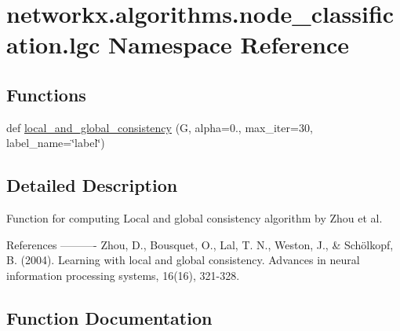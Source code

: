 \hypertarget{namespacenetworkx_1_1algorithms_1_1node__classification_1_1lgc}{}\section{networkx.\+algorithms.\+node\+\_\+classification.\+lgc Namespace Reference}
\label{namespacenetworkx_1_1algorithms_1_1node__classification_1_1lgc}
\subsection*{Functions}
\begin{DoxyCompactItemize}
\item 
def \hyperlink{namespacenetworkx_1_1algorithms_1_1node__classification_1_1lgc_a8984d2cd321fc8788a8aaafcf355ed48}{local\+\_\+and\+\_\+global\+\_\+consistency} (G, alpha=0., max\+\_\+iter=30, label\+\_\+name=\char`\"{}label\char`\"{})
\end{DoxyCompactItemize}


\subsection{Detailed Description}
\begin{DoxyVerb}Function for computing Local and global consistency algorithm by Zhou et al.

References
----------
Zhou, D., Bousquet, O., Lal, T. N., Weston, J., & Schölkopf, B. (2004).
Learning with local and global consistency.
Advances in neural information processing systems, 16(16), 321-328.
\end{DoxyVerb}
 

\subsection{Function Documentation}
\mbox{\label{namespacenetworkx_1_1algorithms_1_1node__classification_1_1lgc_a8984d2cd321fc8788a8aaafcf355ed48}} 
